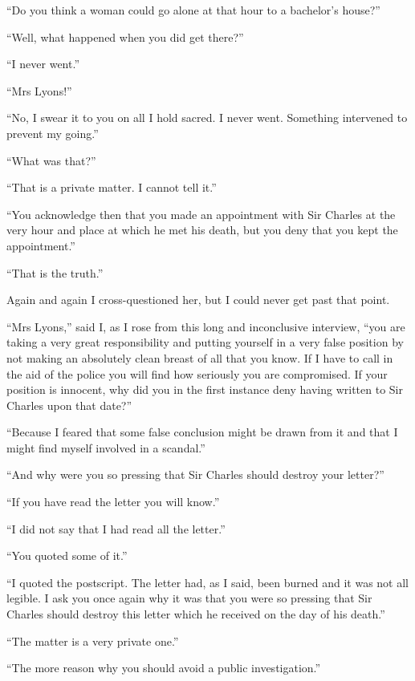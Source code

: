\documentclass[paper=5.5in:8.5in,BCOR=7mm,twoside,DIV=calc,12pt,usegeometry,openany,chapterprefix,endperiod,headings=big]{scrbook} %
\begin{document}
\enquote{Do you think a woman could go alone at that hour to a bachelor's house?}

\enquote{Well, what happened when you did get there?}

\enquote{I never went.}

\enquote{Mrs Lyons!}

\enquote{No, I swear it to you on all I hold sacred. I never went. Something intervened to prevent my going.}

\enquote{What was that?}

\enquote{That is a private matter. I cannot tell it.}

\enquote{You acknowledge then that you made an appointment with Sir Charles at the very hour and place at which he met his death, but you deny that you kept the appointment.}

\enquote{That is the truth.}

Again and again I cross-questioned her, but I could never get past that point.

\enquote{Mrs Lyons,} said I, as I rose from this long and inconclusive interview, \enquote{you are taking a very great responsibility and putting yourself in a very false position by not making an absolutely clean breast of all that you know. If I have to call in the aid of the police you will find how seriously you are compromised. If your position is innocent, why did you in the first instance deny having written to Sir Charles upon that date?}

\enquote{Because I feared that some false conclusion might be drawn from it and that I might find myself involved in a scandal.}

\enquote{And why were you so pressing that Sir Charles should destroy your letter?}

\enquote{If you have read the letter you will know.}

\enquote{I did not say that I had read all the letter.}

\enquote{You quoted some of it.}

\enquote{I quoted the postscript. The letter had, as I said, been burned and it was not all legible. I ask you once again why it was that you were so pressing that Sir Charles should destroy this letter which he received on the day of his death.}

\enquote{The matter is a very private one.}

\enquote{The more reason why you should avoid a public investigation.}
\end{document}
